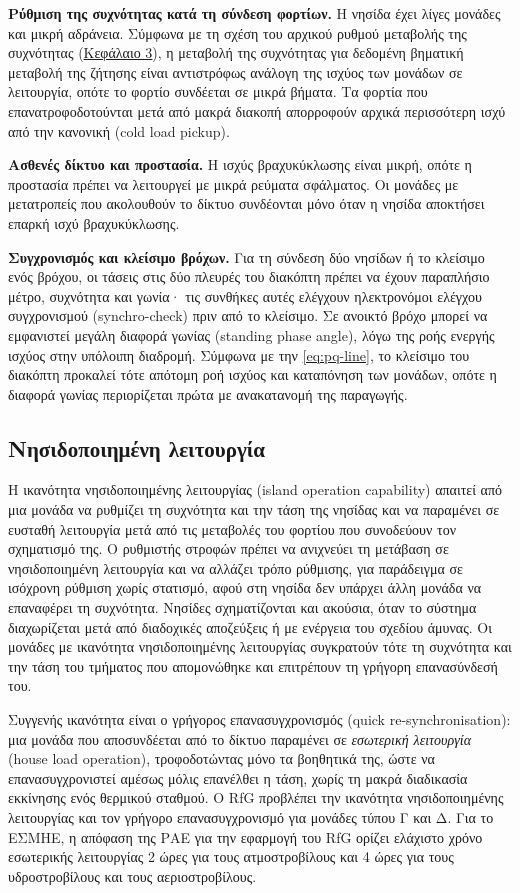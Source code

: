 \textbf{Ρύθμιση της συχνότητας κατά τη σύνδεση φορτίων.} Η νησίδα έχει λίγες μονάδες και μικρή
αδράνεια. Σύμφωνα με τη σχέση του αρχικού ρυθμού μεταβολής της συχνότητας
(\hyperref[kef-03-theoria]{Κεφάλαιο 3}), η μεταβολή της συχνότητας για δεδομένη βηματική
μεταβολή της ζήτησης είναι αντιστρόφως ανάλογη της ισχύος των μονάδων σε λειτουργία, οπότε το
φορτίο συνδέεται σε μικρά βήματα. Τα φορτία που επανατροφοδοτούνται μετά από μακρά διακοπή
απορροφούν αρχικά περισσότερη ισχύ από την κανονική (cold load pickup).

\textbf{Ασθενές δίκτυο και προστασία.} Η ισχύς βραχυκύκλωσης είναι μικρή, οπότε η προστασία
πρέπει να λειτουργεί με μικρά ρεύματα σφάλματος. Οι μονάδες με
μετατροπείς που ακολουθούν το δίκτυο συνδέονται μόνο όταν η νησίδα αποκτήσει επαρκή ισχύ
βραχυκύκλωσης.

\textbf{Συγχρονισμός και κλείσιμο βρόχων.} Για τη σύνδεση δύο νησίδων ή το κλείσιμο ενός
βρόχου, οι τάσεις στις δύο πλευρές του διακόπτη πρέπει να έχουν παραπλήσιο μέτρο, συχνότητα και
γωνία· τις συνθήκες αυτές ελέγχουν ηλεκτρονόμοι ελέγχου συγχρονισμού (synchro-check) πριν από
το κλείσιμο. Σε ανοικτό βρόχο μπορεί να εμφανιστεί μεγάλη διαφορά γωνίας (standing phase
angle), λόγω της ροής ενεργής ισχύος στην υπόλοιπη διαδρομή. Σύμφωνα με την
\eqref{eq:pq-line}, το κλείσιμο του διακόπτη προκαλεί τότε απότομη ροή ισχύος και καταπόνηση
των μονάδων, οπότε η διαφορά γωνίας περιορίζεται πρώτα με ανακατανομή της παραγωγής.

\subsection{Νησιδοποιημένη λειτουργία}
\label{sec:island}

Η ικανότητα νησιδοποιημένης λειτουργίας (island operation capability) απαιτεί από μια μονάδα
να ρυθμίζει τη συχνότητα και την τάση της νησίδας και να παραμένει σε ευσταθή λειτουργία μετά από
τις μεταβολές του φορτίου που συνοδεύουν τον σχηματισμό της. Ο ρυθμιστής στροφών πρέπει να
ανιχνεύει τη μετάβαση σε νησιδοποιημένη λειτουργία και να αλλάζει τρόπο ρύθμισης, για παράδειγμα σε
ισόχρονη ρύθμιση χωρίς στατισμό, αφού στη νησίδα δεν υπάρχει άλλη μονάδα να επαναφέρει τη
συχνότητα. Νησίδες σχηματίζονται και ακούσια, όταν το σύστημα διαχωρίζεται μετά από διαδοχικές
αποζεύξεις ή με ενέργεια του σχεδίου άμυνας. Οι μονάδες με ικανότητα νησιδοποιημένης λειτουργίας
συγκρατούν τότε τη συχνότητα και την τάση του τμήματος που απομονώθηκε και επιτρέπουν τη
γρήγορη επανασύνδεσή του.

Συγγενής ικανότητα είναι ο γρήγορος επανασυγχρονισμός (quick re-synchronisation): μια μονάδα
που αποσυνδέεται από το δίκτυο παραμένει σε \emph{εσωτερική λειτουργία} (house load operation),
τροφοδοτώντας μόνο τα βοηθητικά της, ώστε να επανασυγχρονιστεί αμέσως μόλις επανέλθει η τάση,
χωρίς τη μακρά διαδικασία εκκίνησης ενός θερμικού σταθμού. Ο RfG προβλέπει την ικανότητα
νησιδοποιημένης λειτουργίας και τον γρήγορο επανασυγχρονισμό για μονάδες τύπου Γ και Δ. Για το
ΕΣΜΗΕ, η απόφαση της ΡΑΕ για την εφαρμογή του RfG ορίζει ελάχιστο χρόνο εσωτερικής λειτουργίας
2 ώρες για τους ατμοστροβίλους και 4 ώρες για τους υδροστροβίλους και τους αεριοστροβίλους.

